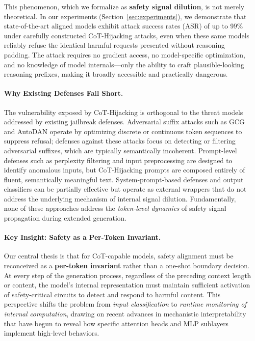 \documentclass[11pt]{article}
\begin{document}
This phenomenon, which we formalize as \textbf{safety signal dilution}, is not merely theoretical. In our experiments (Section~\ref{sec:experiments}), we demonstrate that state-of-the-art aligned models exhibit attack success rates (ASR) of up to 99\% under carefully constructed CoT-Hijacking attacks, even when these same models reliably refuse the identical harmful requests presented without reasoning padding. The attack requires no gradient access, no model-specific optimization, and no knowledge of model internals---only the ability to craft plausible-looking reasoning prefixes, making it broadly accessible and practically dangerous.

\paragraph{Why Existing Defenses Fall Short.} The vulnerability exposed by CoT-Hijacking is orthogonal to the threat models addressed by existing jailbreak defenses. Adversarial suffix attacks such as GCG \citep{zou2023universal} and AutoDAN \citep{liu2024autodan} operate by optimizing discrete or continuous token sequences to suppress refusal; defenses against these attacks focus on detecting or filtering adversarial suffixes, which are typically semantically incoherent. Prompt-level defenses such as perplexity filtering \citep{jain2023baseline} and input preprocessing \citep{robey2023smoothllm} are designed to identify anomalous inputs, but CoT-Hijacking prompts are composed entirely of fluent, semantically meaningful text. System-prompt-based defenses and output classifiers \citep{inan2023llamaguard} can be partially effective but operate as external wrappers that do not address the underlying mechanism of internal signal dilution. Fundamentally, none of these approaches address the \emph{token-level dynamics} of safety signal propagation during extended generation.

\paragraph{Key Insight: Safety as a Per-Token Invariant.} Our central thesis is that for CoT-capable models, safety alignment must be reconceived as a \textbf{per-token invariant} rather than a one-shot boundary decision. At every step of the generation process, regardless of the preceding context length or content, the model's internal representation must maintain sufficient activation of safety-critical circuits to detect and respond to harmful content. This perspective shifts the problem from \emph{input classification} to \emph{runtime monitoring of internal computation}, drawing on recent advances in mechanistic interpretability \citep{elhage2021mathematical, olsson2022context, conmy2023automated} that have begun to reveal how specific attention heads and MLP sublayers implement high-level behaviors.
\end{document}
